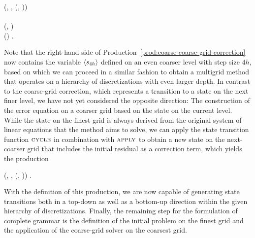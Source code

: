 \begin{bnf}
	 {
		(\bnfts{$\omega$}, \bnfsp {}, \bnfsp {}(, \bnfsp {})) \bnfor
	} \\
	\label{prod:coarse-coarse-grid-correction} \\
	 {
		(, \bnfsp {})
	} \\
	 {
		() \bnfsp {} \bnfsp {}.
	}
\end{bnf}
Note that the right-hand side of Production~\eqref{prod:coarse-coarse-grid-correction} now contains the variable $\langle s_{4h} \rangle$ defined on an even coarser level with step size $4h$, based on which we can proceed in a similar fashion to obtain a multigrid method that operates on a hierarchy of discretizations with even larger depth.
In contrast to the coarse-grid correction, which represents a transition to a state on the next finer level, we have not yet considered the opposite direction: The construction of the error equation on a coarser grid based on the state on the current level.
While the state on the finest grid is always derived from the original system of linear equations that the method aims to solve, we can apply the state transition function $\textsc{cycle}$ in combination with $\textsc{apply}$ to obtain a new state on the next-coarser grid that includes the initial residual as a correction term, which yields the production
\begin{bnf}
 {
	(, \bnfsp {}, \bnfsp {}(, \bnfsp {}))
}.
\label{prod:coarsening}
\end{bnf}
With the definition of this production, we are now capable of generating state transitions both in a top-down as well as a bottom-up direction within the given hierarchy of discretizations.
Finally, the remaining step for the formulation of complete grammar is the definition of the initial problem on the finest grid and the application of the coarse-grid solver on the coarsest grid.
